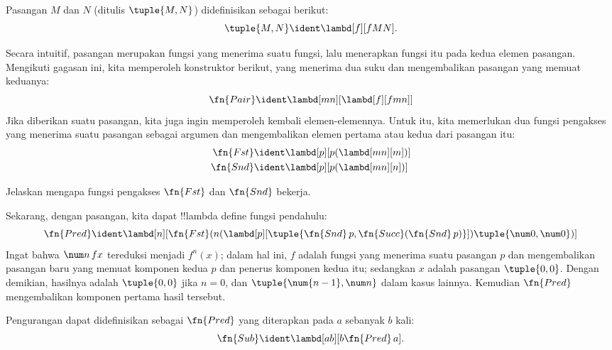 \documentclass[../../../include/open-logic-section]{subfiles}
\begin{document}

\begin{defn}
Pasangan $M$ dan $N$ (ditulis $\tuple{M,N}$) didefinisikan sebagai berikut:
\[
\tuple{M,N} \ident \lambd[f][fMN].
\]
\end{defn}
  
Secara intuitif, pasangan merupakan fungsi yang menerima suatu fungsi, lalu
menerapkan fungsi itu pada kedua elemen pasangan. Mengikuti gagasan ini, kita
memperoleh konstruktor berikut, yang menerima dua suku dan mengembalikan
pasangan yang memuat keduanya:
\[
  \fn{Pair} \ident \lambd[mn][\lambd[f][fmn]]
\]
Jika diberikan suatu pasangan, kita juga ingin memperoleh kembali
elemen-elemennya. Untuk itu, kita memerlukan dua fungsi pengakses yang menerima
suatu pasangan sebagai argumen dan mengembalikan elemen pertama atau kedua dari
pasangan itu:
\begin{align*}
  \fn{Fst} & \ident \lambd[p][p(\lambd[mn][m])]\\
  \fn{Snd} & \ident \lambd[p][p(\lambd[mn][n])]
\end{align*}

\begin{prob}
  Jelaskan mengapa fungsi pengakses $\fn{Fst}$ dan $\fn{Snd}$ bekerja.
\end{prob}

Sekarang, dengan pasangan, kita dapat !!{lambda define} fungsi pendahulu:
\[
  \fn{Pred} \ident \lambd[n][\fn{Fst}(n (\lambd[p][\tuple{\fn{Snd}\, {p}, \fn{Succ}(\fn{Snd}\, {p})}]) \tuple{\num 0, \num 0})]
\]
Ingat bahwa $\num n\, f x$ tereduksi menjadi $f^{n}(x)$; dalam hal ini,
$f$ adalah fungsi yang menerima suatu pasangan $p$ dan mengembalikan pasangan
baru yang memuat komponen kedua $p$ dan penerus komponen kedua itu; sedangkan
$x$ adalah pasangan $\tuple{0,0}$. Dengan demikian, hasilnya adalah
$\tuple{0,0}$ jika $n=0$, dan $\tuple{\num{n-1}, \num n}$ dalam kasus
lainnya. Kemudian $\fn{Pred}$ mengembalikan komponen pertama hasil tersebut.

Pengurangan dapat didefinisikan sebagai $\fn{Pred}$ yang diterapkan pada $a$
sebanyak $b$ kali:
\[
\fn{Sub} \ident \lambd[ab][b \fn{Pred}\, a].
\]
    
\end{document}
